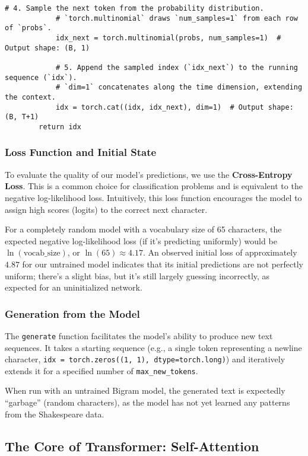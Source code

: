\begin{lstlisting}[caption={BigramLanguageModel class}]
            # 4. Sample the next token from the probability distribution.
            # `torch.multinomial` draws `num_samples=1` from each row of `probs`.
            idx_next = torch.multinomial(probs, num_samples=1)  # Output shape: (B, 1)
            
            # 5. Append the sampled index (`idx_next`) to the running sequence (`idx`).
            # `dim=1` concatenates along the time dimension, extending the context.
            idx = torch.cat((idx, idx_next), dim=1)  # Output shape: (B, T+1)
        return idx
\end{lstlisting}

\subsubsection{Loss Function and Initial State}

To evaluate the quality of our model's predictions, we use the \textbf{Cross-Entropy Loss}. This is a common choice for classification problems and is equivalent to the negative log-likelihood loss. Intuitively, this loss function encourages the model to assign high scores (logits) to the correct next character.

For a completely random model with a vocabulary size of 65 characters, the expected negative log-likelihood loss (if it's predicting uniformly) would be $\ln(\text{vocab\_size})$, or $\ln(65) \approx 4.17$. An observed initial loss of approximately $4.87$ for our untrained model indicates that its initial predictions are not perfectly uniform; there's a slight bias, but it's still largely guessing incorrectly, as expected for an uninitialized network.

\subsubsection{Generation from the Model}

The \texttt{generate} function facilitates the model's ability to produce new text sequences. It takes a starting sequence (e.g., a single token representing a newline character, \texttt{idx = torch.zeros((1, 1), dtype=torch.long)}) and iteratively extends it for a specified number of \texttt{max\_new\_tokens}.

When run with an untrained Bigram model, the generated text is expectedly ``garbage'' (random characters), as the model has not yet learned any patterns from the Shakespeare data.

\subsection{The Core of Transformer: Self-Attention}

